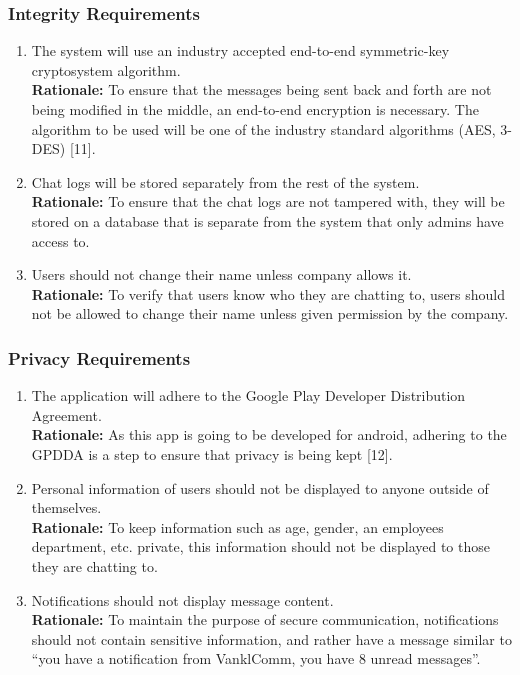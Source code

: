 \documentclass[]{article}
\begin{document}
\subsubsection{Integrity Requirements}
\label{ssub:integrity_requirements}
\begin{enumerate}[{SR-INT}1. ]
	\item The system will use an industry accepted end-to-end symmetric-key cryptosystem algorithm.
	      \\\textbf{Rationale:} To ensure that the messages being sent back and forth are not being modified in the middle, an end-to-end encryption is necessary. The algorithm to be used will be one of the industry standard algorithms (AES, 3-DES) [11].
	\item Chat logs will be stored separately from the rest of the system.
	      \\\textbf{Rationale:} To ensure that the chat logs are not tampered with, they will be stored on a database that is separate from the system that only admins have access to.
	\item Users should not change their name unless company allows it.
	      \\\textbf{Rationale:} To verify that users know who they are chatting to, users should not be allowed to change their name unless given permission by the company.

\end{enumerate}

\subsubsection{Privacy Requirements}
\label{ssub:privacy_requirements}
\begin{enumerate}[{SR-P}1. ]
	\item The application will adhere to the Google Play Developer Distribution Agreement.
	      \\\textbf{Rationale:} As this app is going to be developed for android, adhering to the GPDDA is a step to ensure that privacy is being kept [12].
	\item Personal information of users should not be displayed to anyone outside of themselves.
	      \\\textbf{Rationale:} To keep information such as age, gender, an employees department, etc. private, this information should not be displayed to those they are chatting to.
	\item Notifications should not display message content.
	      \\\textbf{Rationale:} To maintain the purpose of secure communication, notifications should not contain sensitive information, and rather have a message similar to “you have a notification from VanklComm, you have 8 unread messages”.

\end{enumerate}
\end{document}
